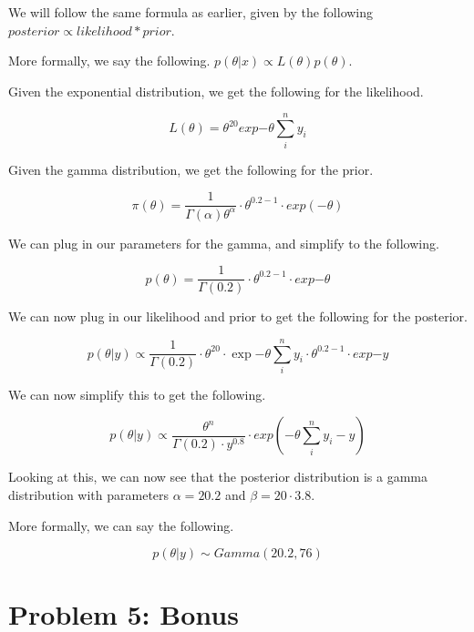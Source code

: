 \documentclass[12pt, letterpaper]{article}
\begin{document}
We will follow the same formula as earlier, given by the following $posterior \propto likelihood * prior$. 

More formally, we say the following. $p(\theta | x) \propto L(\theta) p(\theta)$. 

Given the exponential distribution, we get the following for the likelihood. 

\begin{equation} 
  L(\theta) = \theta^{20} exp{- \theta \sum_i^n y_i}  
\end{equation} 

Given the gamma distribution, we get the following for the prior. 

\begin{equation}
\pi(\theta) = \frac{1}{\Gamma(\alpha) \theta^{\alpha}} \cdot \theta^{0.2-1} \cdot exp(-\theta)
\end{equation}

We can plug in our parameters for the gamma, and simplify to the following. 

\begin{equation} 
  p(\theta) = \frac{1}{\Gamma(0.2)} \cdot \theta ^{0.2 - 1} \cdot exp{- \theta} 
\end{equation} 

We can now plug in our likelihood and prior to get the following for the posterior. 

\begin{equation}
  p(\theta | y) \propto \frac{1}{\Gamma(0.2)} \cdot \theta^{20} \cdot \exp{- \theta \sum_i^n y_i} \cdot \theta^{0.2 - 1} \cdot exp{- y}
\end{equation} 

We can now simplify this to get the following. 

\begin{equation}
p(\theta | y) \propto \frac{\theta^n}{\Gamma(0.2) \cdot y^{0.8}} \cdot exp(-\theta \sum_i^n y_i - y)
\end{equation}

Looking at this, we can now see that the posterior distribution is a gamma distribution with parameters $\alpha = 20.2$ and $\beta = 20 \cdot 3.8$. 

More formally, we can say the following. 

\begin{equation} 
  p(\theta | y) \sim Gamma(20.2, 76) 
\end{equation} 

\section{Problem 5: Bonus}
\end{document}
